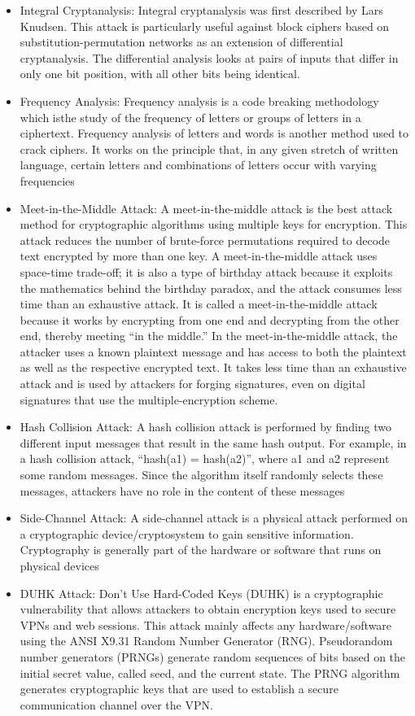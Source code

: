 \begin{itemize}
    \item Integral Cryptanalysis: Integral cryptanalysis was first described by Lars Knudsen. This attack is particularly useful against block ciphers based on substitution-permutation networks as an extension of differential cryptanalysis. The differential analysis looks at pairs of inputs that differ in only one bit position, with all other bits being identical.
    \item Frequency Analysis: Frequency analysis is a code breaking methodology which isthe study of the frequency of letters or groups of letters in a ciphertext. Frequency analysis of letters and words is another method used to crack ciphers. It works on the principle that, in any given stretch of written language, certain letters and combinations of letters occur with varying frequencies
    \item Meet-in-the-Middle Attack: A meet-in-the-middle attack is the best attack method for cryptographic algorithms using multiple keys for encryption. This attack reduces the number of brute-force permutations required to decode text encrypted by more than one key. A meet-in-the-middle attack uses space-time trade-off; it is also a type of birthday attack because it exploits the mathematics behind the birthday paradox, and the attack consumes less time than an exhaustive attack. It is called a meet-in-the-middle attack because it works by encrypting from one end and decrypting from the other end, thereby meeting “in the middle.” In the meet-in-the-middle attack, the attacker uses a known plaintext message and has access to both the plaintext as well as the respective encrypted text. It takes less time than an exhaustive attack and is used by attackers for forging signatures, even on digital signatures that use the multiple-encryption scheme.
    \item Hash Collision Attack: A hash collision attack is performed by finding two different input messages that result in the same hash output. For example, in a hash collision attack, “hash(a1) = hash(a2)”, where a1 and a2 represent some random messages. Since the algorithm itself randomly selects these messages, attackers have no role in the content of these messages
    \item Side-Channel Attack: A side-channel attack is a physical attack performed on a cryptographic device/cryptosystem to gain sensitive information. Cryptography is generally part of the hardware or software that runs on physical devices
    \item DUHK Attack: Don't Use Hard-Coded Keys (DUHK) is a cryptographic vulnerability that allows attackers to obtain encryption keys used to secure VPNs and web sessions. This attack mainly affects any hardware/software using the ANSI X9.31 Random Number Generator (RNG). Pseudorandom number generators (PRNGs) generate random sequences of bits based on the initial secret value, called seed, and the current state. The PRNG algorithm generates cryptographic keys that are used to establish a secure communication channel over the VPN.

\end{itemize}

